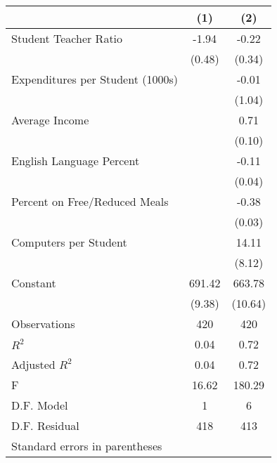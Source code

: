 \begin{tabular}{l*{2}{c}} \hline\hline
                    &\multicolumn{1}{c}{(1)}&\multicolumn{1}{c}{(2)}\\
\hline
Student Teacher Ratio&       -1.94&       -0.22\\
                    &      (0.48)&      (0.34)\\
[1em]
Expenditures per Student (1000s)&            &       -0.01\\
                    &            &      (1.04)\\
[1em]
Average Income      &            &        0.71\\
                    &            &      (0.10)\\
[1em]
English Language Percent&            &       -0.11\\
                    &            &      (0.04)\\
[1em]
Percent on Free/Reduced Meals&            &       -0.38\\
                    &            &      (0.03)\\
[1em]
Computers per Student&            &       14.11\\
                    &            &      (8.12)\\
[1em]
Constant            &      691.42&      663.78\\
                    &      (9.38)&     (10.64)\\
\hline
Observations        &         420&         420\\
\(R^{2}\)           &        0.04&        0.72\\
Adjusted \(R^{2}\)  &        0.04&        0.72\\
F                   &       16.62&      180.29\\
D.F. Model          &           1&           6\\
D.F. Residual       &         418&         413\\
\hline\hline
\multicolumn{3}{l}{\footnotesize Standard errors in parentheses}\\
\end{tabular}
